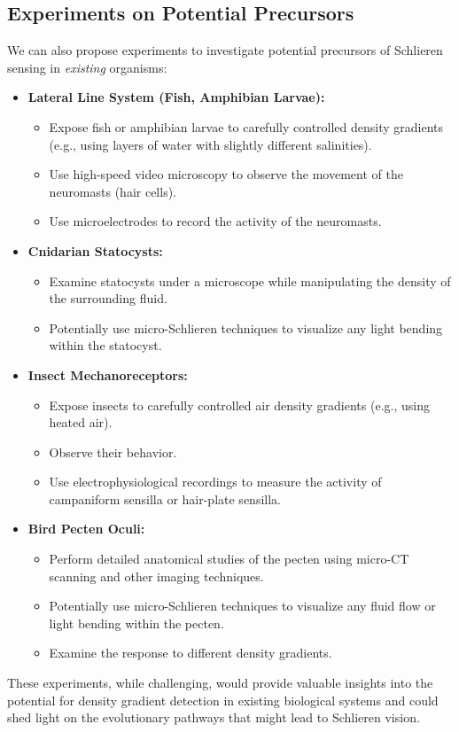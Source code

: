 \documentclass[11pt]{article}
\begin{document}
\subsection{Experiments on Potential Precursors}

We can also propose experiments to investigate potential precursors of Schlieren sensing in \textit{existing} organisms:
\begin{itemize}
    \item \textbf{Lateral Line System (Fish, Amphibian Larvae):}
    \begin{itemize}
        \item Expose fish or amphibian larvae to carefully controlled density gradients (e.g., using layers of water with slightly different salinities).
        \item Use high-speed video microscopy to observe the movement of the neuromasts (hair cells).
        \item Use microelectrodes to record the activity of the neuromasts.
    \end{itemize}
    \item \textbf{Cnidarian Statocysts:}
    \begin{itemize}
        \item Examine statocysts under a microscope while manipulating the density of the surrounding fluid.
        \item Potentially use micro-Schlieren techniques to visualize any light bending within the statocyst.
    \end{itemize}
    \item \textbf{Insect Mechanoreceptors:}
    \begin{itemize}
        \item Expose insects to carefully controlled air density gradients (e.g., using heated air).
        \item Observe their behavior.
        \item Use electrophysiological recordings to measure the activity of campaniform sensilla or hair-plate sensilla.
    \end{itemize}
    \item \textbf{Bird Pecten Oculi:}
    \begin{itemize}
        \item Perform detailed anatomical studies of the pecten using micro-CT scanning and other imaging techniques.
        \item Potentially use micro-Schlieren techniques to visualize any fluid flow or light bending within the pecten.
        \item Examine the response to different density gradients.
    \end{itemize}
\end{itemize}
These experiments, while challenging, would provide valuable insights into the potential for density gradient detection in existing biological systems and could shed light on the evolutionary pathways that might lead to Schlieren vision.
\end{document}

